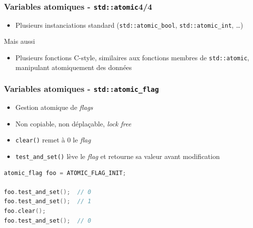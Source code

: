 \documentclass[C++.tex]{subfiles}
\begin{document}
\begin{frame}[fragile]
	\frametitle{Variables atomiques - \lstinline|std::atomic|\titlehfill{}4/4}
	\begin{itemize}
		\item Plusieurs instanciations standard (\lstinline|std::atomic_bool|, \lstinline|std::atomic_int|, \ldots)
	\end{itemize}

	\begin{block}{Mais aussi}
		\begin{itemize}
			\item Plusieurs fonctions \og C-style\fg{}, similaires aux fonctions membres de \lstinline|std::atomic|, manipulant atomiquement des données
		\end{itemize}
	\end{block}
\end{frame}

\begin{frame}[fragile]
	\frametitle{Variables atomiques - \lstinline|std::atomic_flag|}
	\begin{itemize}
		\item Gestion atomique de \textit{flags}
		\item Non copiable, non déplaçable, \textit{lock free}
		\item \lstinline|clear()| remet à 0 le \textit{flag}
		\item \lstinline|test_and_set()| lève le \textit{flag} et retourne sa valeur avant modification
	\end{itemize}

	\begin{lstlisting}[language=C++]
atomic_flag foo = ATOMIC_FLAG_INIT;

foo.test_and_set();  // 0
foo.test_and_set();  // 1
foo.clear();
foo.test_and_set();  // 0\end{lstlisting}
\end{frame}
\end{document}
